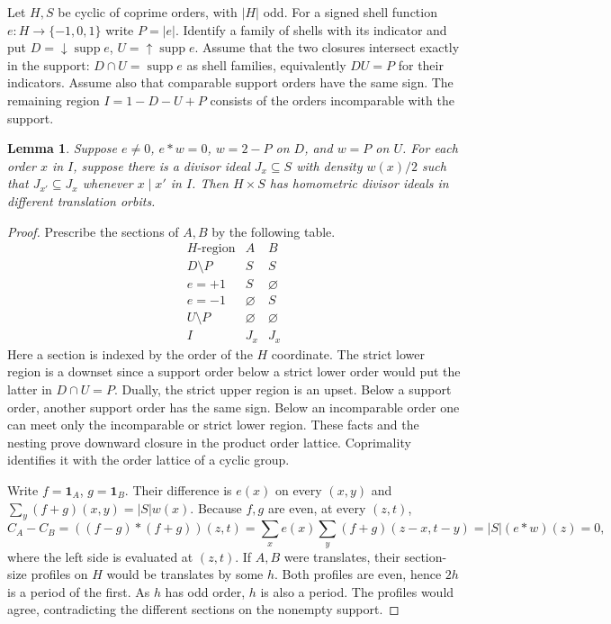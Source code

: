 \documentclass[11pt]{article}
\numberwithin{equation}{section}
\newtheorem{lemma}[theorem]{Lemma}
\theoremstyle{definition}
\theoremstyle{remark}
\newcommand{\ind}{\mathbf1}
\newcommand{\abs}[1]{\lvert #1\rvert}
\begin{document}
Let $H,S$ be cyclic of coprime orders, with $\abs H$ odd. For a signed shell function $e:H\to\{-1,0,1\}$ write $P=|e|$. Identify a family of shells with its indicator and put $D=\downarrow\!\operatorname{supp} e$, $U=\uparrow\!\operatorname{supp} e$. Assume that the two closures intersect exactly in the support: $D\cap U=\operatorname{supp}e$ as shell families, equivalently $DU=P$ for their indicators. Assume also that comparable support orders have the same sign. The remaining region $I=1-D-U+P$ consists of the orders incomparable with the support.

\begin{lemma}\label{vi:lem:sections}
Suppose $e\ne0$, $e*w=0$, $w=2-P$ on $D$, and $w=P$ on $U$. For each order $x$ in $I$, suppose there is a divisor ideal $J_x\subseteq S$ with density $w(x)/2$ such that $J_{x'}\subseteq J_x$ whenever $x\mid x'$ in $I$. Then $H\times S$ has homometric divisor ideals in different translation orbits.
\end{lemma}
\begin{proof}
Prescribe the sections of $A,B$ by the following table.
\[
\begin{array}{c|cc}
 H\text{-region} & A & B\\ \hline
 D\setminus P&S&S\\ e=+1&S&\varnothing\\ e=-1&\varnothing&S\\
 U\setminus P&\varnothing&\varnothing\\ I&J_x&J_x
\end{array}
\]
Here a section is indexed by the order of the $H$ coordinate. The strict lower region is a downset since a support order below a strict lower order would put the latter in $D\cap U=P$. Dually, the strict upper region is an upset. Below a support order, another support order has the same sign. Below an incomparable order one can meet only the incomparable or strict lower region. These facts and the nesting prove downward closure in the product order lattice. Coprimality identifies it with the order lattice of a cyclic group.

Write $f=\ind_A$, $g=\ind_B$. Their difference is $e(x)$ on every $(x,y)$ and $\sum_y(f+g)(x,y)=|S|w(x)$. Because $f,g$ are even, at every $(z,t)$,
\[
 C_A-C_B=((f-g)*(f+g))(z,t)
 =\sum_x e(x)\sum_y(f+g)(z-x,t-y)=|S|(e*w)(z)=0,
\]
where the left side is evaluated at $(z,t)$. If $A,B$ were translates, their section-size profiles on $H$ would be translates by some $h$. Both profiles are even, hence $2h$ is a period of the first. As $h$ has odd order, $h$ is also a period. The profiles would agree, contradicting the different sections on the nonempty support.
\end{proof}
\end{document}
